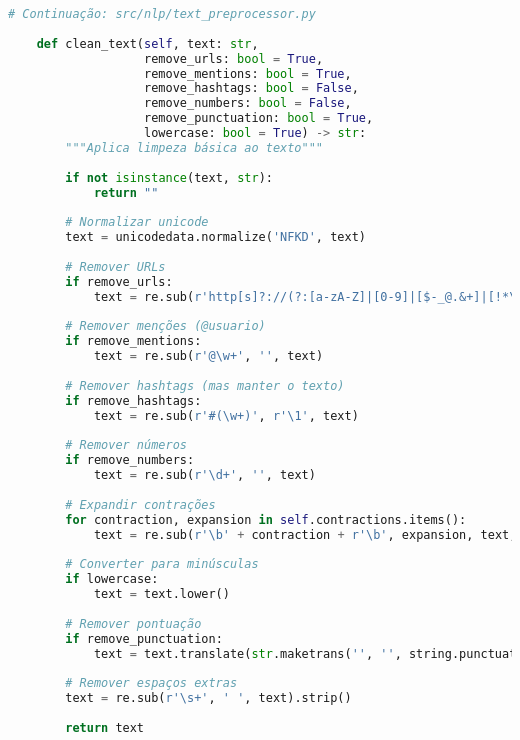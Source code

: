 \newpage

\begin{pythonbox}
\begin{lstlisting}[language=Python]
# Continuação: src/nlp/text_preprocessor.py
    
    def clean_text(self, text: str, 
                   remove_urls: bool = True,
                   remove_mentions: bool = True,
                   remove_hashtags: bool = False,
                   remove_numbers: bool = False,
                   remove_punctuation: bool = True,
                   lowercase: bool = True) -> str:
        """Aplica limpeza básica ao texto"""
        
        if not isinstance(text, str):
            return ""
            
        # Normalizar unicode
        text = unicodedata.normalize('NFKD', text)
        
        # Remover URLs
        if remove_urls:
            text = re.sub(r'http[s]?://(?:[a-zA-Z]|[0-9]|[$-_@.&+]|[!*\\(\\),]|(?:%[0-9a-fA-F][0-9a-fA-F]))+', '', text)
        
        # Remover menções (@usuario)
        if remove_mentions:
            text = re.sub(r'@\w+', '', text)
            
        # Remover hashtags (mas manter o texto)
        if remove_hashtags:
            text = re.sub(r'#(\w+)', r'\1', text)
            
        # Remover números
        if remove_numbers:
            text = re.sub(r'\d+', '', text)
            
        # Expandir contrações
        for contraction, expansion in self.contractions.items():
            text = re.sub(r'\b' + contraction + r'\b', expansion, text, flags=re.IGNORECASE)
            
        # Converter para minúsculas
        if lowercase:
            text = text.lower()
            
        # Remover pontuação
        if remove_punctuation:
            text = text.translate(str.maketrans('', '', string.punctuation))
            
        # Remover espaços extras
        text = re.sub(r'\s+', ' ', text).strip()
            
        return text
        \end{lstlisting}
\end{pythonbox}
